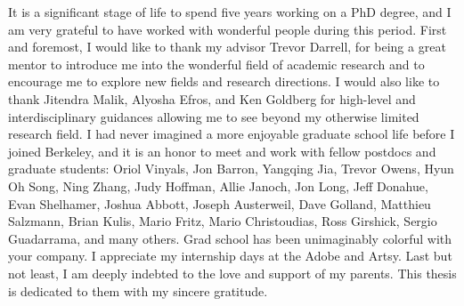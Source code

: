 \begin{acknowledgements}
It is a significant stage of life to spend five years working on a PhD degree, and I am very grateful to have worked with wonderful people during this period. First and foremost, I would like to thank my advisor Trevor Darrell, for being a great mentor to introduce me into the wonderful field of academic research and to encourage me to explore new fields and research directions. I would also like to thank Jitendra Malik, Alyosha Efros, and Ken Goldberg for high-level and interdisciplinary guidances allowing me to see beyond my otherwise limited research field.
I had never imagined a more enjoyable graduate school life before I joined Berkeley, and it is an honor to meet and work with fellow postdocs and graduate students: Oriol Vinyals, Jon Barron, Yangqing Jia, Trevor Owens, Hyun Oh Song, Ning Zhang, Judy Hoffman, Allie Janoch, Jon Long, Jeff Donahue, Evan Shelhamer, Joshua Abbott, Joseph Austerweil, Dave Golland, Matthieu Salzmann, Brian Kulis, Mario Fritz, Mario Christoudias, Ross Girshick, Sergio Guadarrama, and many others. Grad school has been unimaginably colorful with your company.
I appreciate my internship days at the Adobe and Artsy.
Last but not least, I am deeply indebted to the love and support of my parents. This thesis is dedicated to them with my sincere gratitude.
\end{acknowledgements}

